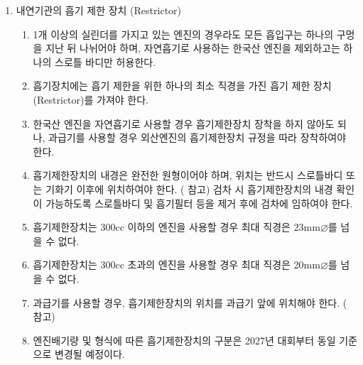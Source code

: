 \documentclass[final,a4paper,10pt]{report}
\begin{document}
\begin{enumerate}
  \item\label{rule:formula-technical.powertrain.restrictor} 내연기관의 흡기 제한 장치 (Restrictor)
    \begin{enumerate}
      \item\label{rule:formula-technical.powertrain.restrictor.single-intake-path} 1개 이상의 실린더를 가지고 있는 엔진의 경우라도 모든 흡입구는 하나의 구멍을 지난 뒤 나뉘어야 하며, 자연흡기로 사용하는 한국산 엔진을 제외하고는 하나의 스로틀 바디만 허용한다.
      \item\label{rule:formula-technical.powertrain.restrictor.single-min-diameter} 흡기장치에는 흡기 제한을 위한 하나의 최소 직경을 가진 흡기 제한 장치(Restrictor)를 가져야 한다.
      \item\label{rule:formula-technical.powertrain.restrictor.korean-engine-na-exemption} 한국산 엔진을 자연흡기로 사용할 경우 흡기제한장치 장착을 하지 않아도 되나, 과급기를 사용할 경우 외산엔진의 흡기제한장치 규정을 따라 장착하여야 한다.
      \item\label{rule:formula-technical.powertrain.restrictor.circular-bore-and-position} 흡기제한장치의 내경은 완전한 원형이어야 하며, 위치는 반드시 스로틀바디 또는 기화기 이후에 위치하여야 한다. ( 참고) 검차 시 흡기제한장치의 내경 확인이 가능하도록 스로틀바디 및 흡기필터 등을 제거 후에 검차에 임하여야 한다.
      \item\label{rule:formula-technical.powertrain.restrictor.diameter-23mm-under-300cc} 흡기제한장치는 300cc 이하의 엔진을 사용할 경우 최대 직경은 23mm$\varnothing$를 넘을 수 없다.
      \item\label{rule:formula-technical.powertrain.restrictor.diameter-20mm-over-300cc} 흡기제한장치는 300cc 초과의 엔진을 사용할 경우 최대 직경은 20mm$\varnothing$를 넘을 수 없다.
      \item\label{rule:formula-technical.powertrain.restrictor.upstream-of-forced-induction} 과급기를 사용할 경우, 흡기제한장치의 위치를 과급기 앞에 위치해야 한다. ( 참고)
      \item\label{rule:formula-technical.powertrain.restrictor.future-standardization-notice} {\color{blue} 엔진배기량 및 형식에 따른 흡기제한장치의 구분은 2027년 대회부터 동일 기준으로 변경될 예정이다.}
    \end{enumerate}


\end{enumerate}
\end{document}
